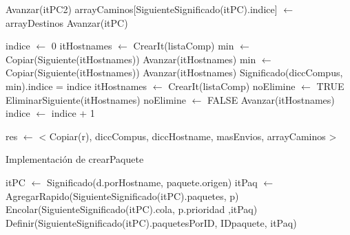 \begin{Algoritmos}
\begin{algorithm}
\begin{algorithmic}[0]
	
\end{algorithmic}
\end{algorithm}

\begin{algorithm}
\begin{algorithmic}[0]

	
			\State Avanzar(itPC2) 
		\EndWhile
		\State arrayCaminos[SiguienteSignificado(itPC).indice] $\gets$ arrayDestinos 
		\State Avanzar(itPC) 
	\EndWhile

	\State indice $\gets$  0 	
	   
		\State itHostnames $\gets$ CrearIt(listaComp) 
		\State min $\gets$ Copiar(Siguiente(itHostnames)) 
		\State Avanzar(itHostnames) 
			 
				\State min $\gets$ Copiar(Siguiente(itHostnames)) 
			\EndIf
			\State Avanzar(itHostnames) 
		\EndWhile
		\State Significado(diccCompus, min).indice = indice 
		\State itHostnames $\gets$ CrearIt(listaComp) 
		\State noElimine $\gets$ TRUE
		  
			 
				\State EliminarSiguiente(itHostnames) 
				\State noElimine $\gets$ FALSE 
			\EndIf
			\State Avanzar(itHostnames) 
		\EndWhile
		\State indice $\gets$ indice + 1 
	\EndWhile
	
	
	\State res $\gets$ < Copiar(r), diccCompus, diccHostname, masEnvios, arrayCaminos > 
	
\EndFunction
\end{algorithmic}
\end{algorithm}

\begin{algorithm}
\caption{Implementaci\'on de crearPaquete}
\begin{algorithmic}[0]
	\State itPC $\gets$ Significado(d.porHostname, paquete.origen) 
	\State itPaq $\gets$ AgregarRapido(SiguienteSignificado(itPC).paquetes, p)  
	\State Encolar(SiguienteSignificado(itPC).cola, p.prioridad ,itPaq)	
	\State Definir(SiguienteSignificado(itPC).paquetesPorID, IDpaquete, itPaq) 
\EndFunction {}
\end{algorithmic}
\end{algorithm}


\end{Algoritmos}
